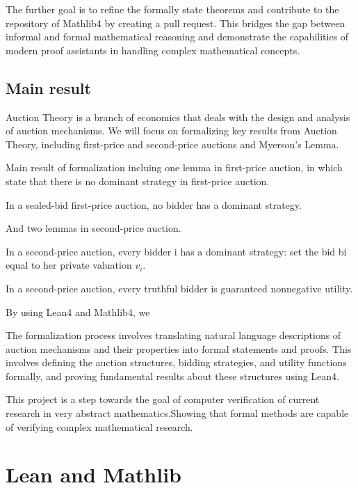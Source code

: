 The further goal is to refine the formally state theorems and contribute to the repository of Mathlib4 by creating a pull request. This bridges the gap between informal and formal mathematical reasoning and demonstrate the capabilities of modern proof assistants in handling complex mathematical concepts.

\section{Main result}
Auction Theory is a branch of economics that deals with the design and analysis of auction mechanisms. We will focus on formalizing key results from Auction Theory, including first-price and second-price auctions and Myerson's Lemma. 

Main result of formalization incluing one lemma in first-price auction, in which state that there is no dominant strategy in first-price auction. 

\begin{lemma}
In a sealed-bid first-price auction, no bidder has a dominant strategy.
\end{lemma}

And two lemmas in second-price auction.

\begin{lemma}
In a second-price auction, every bidder i has a dominant strategy: set the bid bi equal to her private valuation \(v_i\).
\end{lemma}

\begin{lemma} In a second-price auction, every truthful bidder is guaranteed nonnegative utility.
\end{lemma}

By using Lean4 and Mathlib4, we 


The formalization process involves translating natural language descriptions of auction mechanisms and their properties into formal statements and proofs. This involves defining the auction structures, bidding strategies, and utility functions formally, and proving fundamental results about these structures using Lean4. 

This project is a step towards the goal of computer verification of current research in very abstract mathematics.Showing that formal methods are capable of verifying complex mathematical research.

\chapter{Lean and Mathlib}

